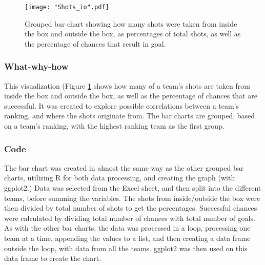 \documentclass[Report.tex]{subfiles}
\begin{document}
\begin{figure}
\center
\texttt{[image: "Shots\_io".pdf]}
\caption{Grouped bar chart showing how many shots were taken from inside the
box and outside the box, as percentages of total shots, as well as the
percentage of chances that result in goal.}
\label{Fig:Shots_IO} 
\end{figure}

\subsubsection{What-why-how}
This visualization (Figure \ref{Fig:Shots_IO} shows how many of a team's shots are taken from inside the
box and outside the box, as well as the percentage of chances that are successful.
It was created to explore possible correlations between a team's ranking, and
where the shots originate from. 
The bar charts are grouped, based on a team's ranking, with the highest ranking
team as the first group. 

\subsubsection{Code}
The bar chart was created in almost the same way as the other grouped bar
charts, utilizing R for both data processing, and creating the graph (with
ggplot2.)
Data was selected from the Excel sheet, and then split into the different teams,
before summing the variables. The shots from inside/outside the box were then
divided by total number of shots to get the percentages. Successful chances were
calculated by dividing total number of chances with total number of goals.
As with the other bar charts, the data was processed in a loop, processing one
team at a time, appending the values to a list, and then creating a data frame
outside the loop, with data from all the teams. ggplot2 was then used on this
data frame to create the chart.
\end{document}
